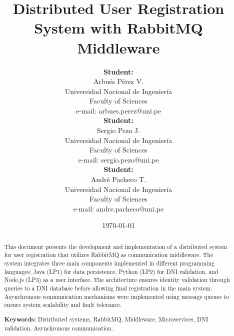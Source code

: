 \documentclass[10pt,a4paper]{article}
\theoremstyle{definition}
\theoremstyle{remark}
\begin{document}
\title{Distributed User Registration System with RabbitMQ Middleware}
\author{
    \begin{minipage}[t]{0.3\textwidth}
        \centering
        \textbf{Student:}\\[5pt]
        {\large Arbués Pérez V.}\\
        Universidad Nacional de Ingeniería\\
        Faculty of Sciences\\
        e-mail: arbues.perez@uni.pe
    \end{minipage}
    \hfill
    \begin{minipage}[t]{0.3\textwidth}
        \centering
        \textbf{Student:}\\[5pt]
        {\large Sergio Pezo J.}\\
        Universidad Nacional de Ingeniería\\
        Faculty of Sciences\\
        e-mail: sergio.pezo@uni.pe
    \end{minipage}
    \hfill
    \begin{minipage}[t]{0.3\textwidth}
        \centering
        \textbf{Student:}\\[5pt]
        {\large André Pacheco T.}\\
        Universidad Nacional de Ingeniería\\
        Faculty of Sciences\\
        e-mail: andre.pacheco@uni.pe
    \end{minipage}
}
\date{\today}
\maketitle

\begin{abstract}
\hspace*{0.5cm}
This document presents the development and implementation of a distributed system for user registration that utilizes RabbitMQ as communication middleware. The system integrates three main components implemented in different programming languages: Java (LP1) for data persistence, Python (LP2) for DNI validation, and Node.js (LP3) as a user interface. The architecture ensures identity validation through queries to a DNI database before allowing final registration in the main system. Asynchronous communication mechanisms were implemented using message queues to ensure system scalability and fault tolerance.

\vspace{5pt}
\textbf{Keywords:} Distributed systems, RabbitMQ, Middleware, Microservices, DNI validation, Asynchronous communication.
\end{abstract}
\end{document}
